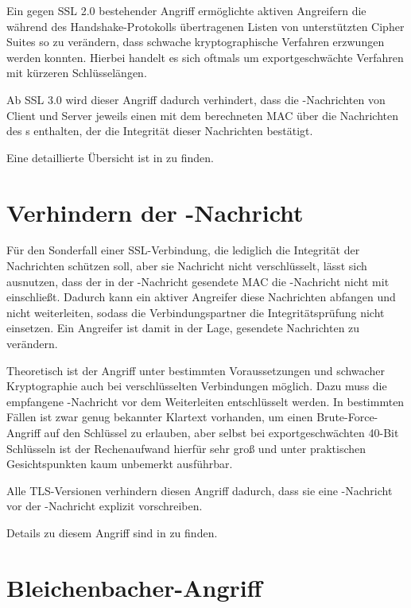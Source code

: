 Ein gegen SSL 2.0 bestehender Angriff ermöglichte aktiven Angreifern die während des Handshake-Protokolls übertragenen Listen von unterstützten Cipher Suites so zu verändern, dass schwache kryptographische Verfahren erzwungen werden konnten. Hierbei handelt es sich oftmals um exportgeschwächte Verfahren mit kürzeren Schlüsselängen.

Ab SSL 3.0 wird dieser Angriff dadurch verhindert, dass die \finished{}-Nachrichten von Client und Server jeweils einen mit dem \mastersecret{} berechneten MAC über die Nachrichten des \handshakeprotocol{}s enthalten, der die Integrität dieser Nachrichten bestätigt.

Eine detaillierte Übersicht ist in \cite{wagner96} zu finden.

\section{Verhindern der \changecipherspec{}-Nachricht}

Für den Sonderfall einer SSL-Verbindung, die lediglich die Integrität der Nachrichten schützen soll, aber sie Nachricht nicht verschlüsselt, lässt sich ausnutzen, dass der in der \finished{}-Nachricht gesendete MAC die \changecipherspec{}-Nachricht nicht mit einschließt. Dadurch kann ein aktiver Angreifer diese Nachrichten abfangen und nicht weiterleiten, sodass die Verbindungspartner die Integritätsprüfung nicht einsetzen. Ein Angreifer ist damit in der Lage, gesendete Nachrichten zu verändern. 

Theoretisch ist der Angriff unter bestimmten Voraussetzungen und schwacher Kryptographie auch bei verschlüsselten Verbindungen möglich. Dazu muss die empfangene \finished{}-Nachricht vor dem Weiterleiten entschlüsselt werden. In bestimmten Fällen ist zwar genug bekannter Klartext vorhanden, um einen Brute-Force-Angriff auf den Schlüssel zu erlauben, aber selbst bei exportgeschwächten 40-Bit Schlüsseln ist der Rechenaufwand hierfür sehr groß und unter praktischen Gesichtspunkten kaum unbemerkt ausführbar.

Alle TLS-Versionen verhindern diesen Angriff dadurch, dass sie eine \changecipherspec{}-Nachricht vor der \finished{}-Nachricht explizit vorschreiben.

Details zu diesem Angriff sind in \cite{wagner96} zu finden.

\section{Bleichenbacher-Angriff}
\label{sec_attack_bleichenbacher}

